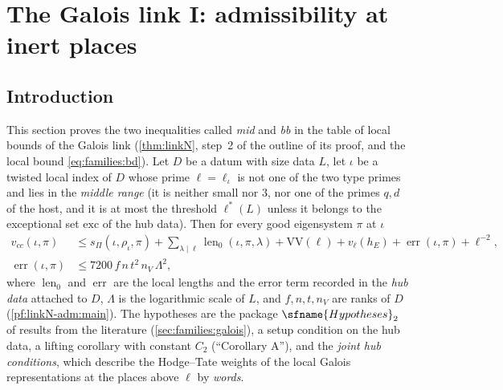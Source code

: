 \section{The Galois link I: admissibility at inert places}\label{sec:pf:linkN-adm}

\providecommand{\linkNadmcol}{\operatorname{col}}
\providecommand{\linkNadmZf}{Z^1_{f}}
\providecommand{\linkNadmHf}{H^1_{f}}
\providecommand{\linkNadmIm}{\operatorname{Im}_f}
\providecommand{\linkNadmlen}{\operatorname{len}}
\providecommand{\linkNadmerr}{\operatorname{err}}
\providecommand{\linkNadmvcc}{v_{cc}}
\providecommand{\linkNadmsP}{s_{\Pi}}
\providecommand{\linkNadmVV}{\mathrm{VV}}
\providecommand{\linkNadmlog}{\log}

\subsection{Introduction}\label{pf:linkN-adm:intro}

This section proves the two inequalities called \emph{mid} and \emph{bb} in the table of local bounds of
the Galois link (\cref{thm:linkN}, step~2 of the outline of its proof, and the local bound
\eqref{eq:families:bd}). Let $D$ be a datum with size data $L$, let $\iota$ be a twisted local index of $D$ whose
prime $\ell=\ell_\iota$ is not one of the two type primes and lies in the \emph{middle range} (it is neither
small nor $3$, nor one of the primes $q,d$ of the host, and it is at most the threshold $\ell^*(L)$ unless it
belongs to the exceptional set $\mathrm{exc}$ of the hub data). Then for every good eigensystem $\pi$ at $\iota$
\begin{align}
\linkNadmvcc(\iota,\pi)&\le \linkNadmsP(\iota,\rho_\iota,\pi)+\sum_{\lambda\mid\ell}\linkNadmlen_0(\iota,\pi,\lambda)
+\linkNadmVV(\ell)+v_\ell(h_E)+\linkNadmerr(\iota,\pi)+\ell^{-2},\label{pf:linkN-adm:eq-mid}\\
\linkNadmerr(\iota,\pi)&\le 7200\,f\,n\,t^2\,n_V\,\Lambda^2,\label{pf:linkN-adm:eq-bb}
\end{align}
where $\linkNadmlen_0$ and $\linkNadmerr$ are the local lengths and the error term recorded in the \emph{hub data}
attached to $D$, $\Lambda$ is the logarithmic scale of $L$, and $f,n,t,n_V$ are ranks of $D$
(\cref{pf:linkN-adm:main}). The hypotheses are the package $\sfname{Hypotheses}_2$ of results from the
literature (\cref{sec:families:galois}), a setup condition on the hub data, a lifting corollary with constant $C_2$
(``Corollary A''), and the \emph{joint hub conditions}, which describe the Hodge--Tate weights of the local
Galois representations at the places above $\ell$ by \emph{words}.

